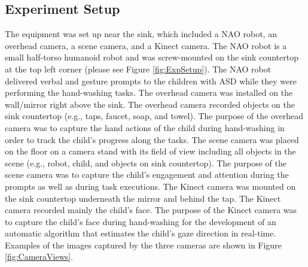\documentclass{ut-thesis}
\begin{document}
\subsection{Experiment Setup}
\label{Sec:ExpSetup}
The equipment was set up near the sink, which included a NAO robot, an overhead camera, a scene camera, and a Kinect camera. The NAO robot is a small half-torso humanoid robot and was screw-mounted on the sink countertop at the top left corner (please see Figure \ref{fig:ExpSetup}). The NAO robot delivered verbal and gesture prompts to the children with ASD while they were performing the hand-washing tasks.  The overhead camera was installed on the wall/mirror right above the sink. The overhead camera recorded objects on the sink countertop (e.g., taps, faucet, soap, and towel). The purpose of the overhead camera was to capture the hand actions of the child during hand-washing in order to track the child's progress along the tasks. The scene camera was placed on the floor on a camera stand with its field of view including all objects in the scene (e.g., robot, child, and objects on sink countertop). The purpose of the scene camera was to capture the child's engagement and attention during the prompts as well as during task executions. The Kinect camera was mounted on the sink countertop underneath the mirror and behind the tap. The Kinect camera recorded mainly the child's face. The purpose of the Kinect camera was to capture the child's face during hand-washing for the development of an automatic algorithm that estimates the child's gaze direction in real-time. Examples of the images captured by the three cameras are shown in Figure \ref{fig:CameraViews}.
\end{document}
